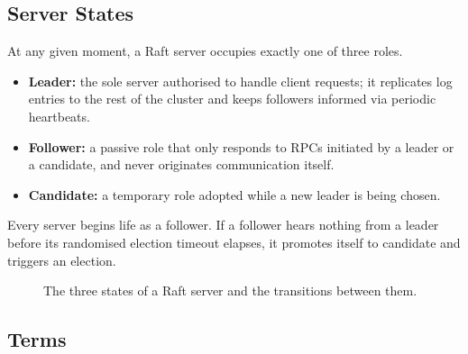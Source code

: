 \subsection{Server States}

At any given moment, a Raft server occupies exactly one of three roles.

\begin{itemize}
    \item \textbf{Leader:} the sole server authorised to handle client requests; it replicates log entries to the rest of the cluster and keeps followers informed via periodic heartbeats.
    \item \textbf{Follower:} a passive role that only responds to RPCs initiated by a leader or a candidate, and never originates communication itself.
    \item \textbf{Candidate:} a temporary role adopted while a new leader is being chosen.
\end{itemize}

Every server begins life as a follower. If a follower hears nothing from a leader before its randomised election timeout elapses, it promotes itself to candidate and triggers an election.

\begin{figure}[H]
\centering
{}
\caption{The three states of a Raft server and the transitions between them.}
\label{fig:raft_states}
\end{figure}

\subsection{Terms}


